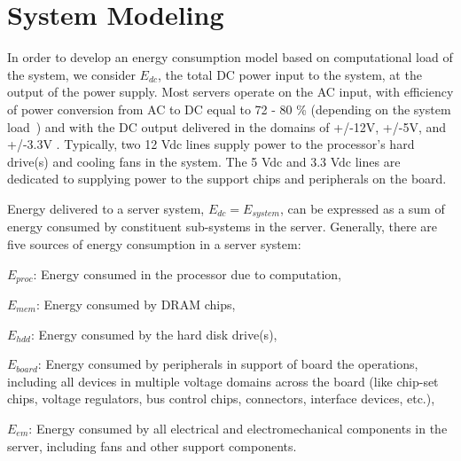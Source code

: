 %
%
\chapter{System Modeling}
\label{chp:modelstruct}
In order to develop an energy consumption model based on computational
load of the system, we consider $E_{dc}$, the total DC power input to
the system, at the output of the power supply.  Most servers operate on
the AC input, with efficiency of power conversion from AC to DC equal to
72 - 80 \% (depending on the system load~\cite{ton2008}) and with the DC
output delivered in the domains of +/-12V, +/-5V, and +/-3.3V
\cite{SSI2004}.  Typically, two 12 Vdc lines supply power to the
processor's hard drive(s) and cooling fans in the system.  The 5 Vdc and
3.3 Vdc lines are dedicated to supplying power to the support chips and
peripherals on the board.

Energy delivered to a server system, $E_{dc} = E_{system}$, can be
expressed as a sum of energy consumed by constituent sub-systems in the
server.  Generally, there are five sources of energy consumption in a
server system:
\begin{description}
\item{$E_{proc}$:} Energy consumed in the processor due to computation,
\item{$E_{mem}$:} Energy consumed by DRAM chips,
\item{$E_{hdd}$:} Energy consumed by the hard disk drive(s),
\item{$E_{board}$:} Energy consumed by peripherals in support of board the
  operations, including all devices in multiple voltage domains across the board
  (like chip-set chips, voltage regulators, bus control chips, connectors, interface devices, etc.),
\item{$E_{em}$:} Energy consumed by all electrical and electromechanical
  components in the server, including fans and other support components.
\end{description}

